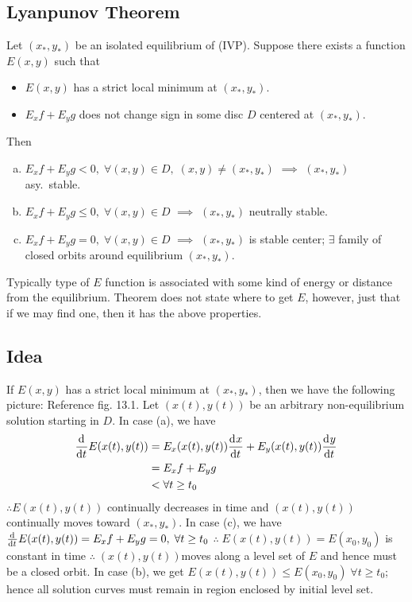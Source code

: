 \documentclass[12pt,twoside]{article}
\begin{document}
\subsection{Lyanpunov Theorem}
Let $(x_*,y_*)$ be an isolated equilibrium of (IVP). Suppose there exists a
function $E(x,y)$ such that
\begin{itemize}
\item $E(x,y)$ has a strict local minimum at $(x_*,y_*)$.
\item $E_x f + E_y g$ does not change sign in some disc $D$ centered at $(x_*,y_*)$.
\end{itemize}
Then
\begin{enumerate}[(a)]
\item $E_x f + E_y g<0,\;\forall(x,y)\in D,\;(x,y)\ne(x_*,y_*)$ $\implies$
  $(x_*,y_*)$ asy.\ stable.
\item $E_x f + E_y g\le0,\;\forall(x,y)\in D$ $\implies$ $(x_*,y_*)$ neutrally
  stable.
\item $E_x f + E_y g=0,\;\forall(x,y)\in D$ $\implies$ $(x_*,y_*)$ is stable center;
  $\exists$ family of closed orbits around equilibrium $(x_*,y_*)$.
\end{enumerate}
Typically type of $E$ function is associated with some kind of energy or
distance from the equilibrium. Theorem does not state where to get $E$, however,
just that if we may find one, then it has the above properties.
\subsection{Idea}
If $E(x,y)$ has a strict local minimum at $(x_*,y_*)$, then we have the
following picture: Reference fig. 13.1. Let $(x(t), y(t))$ be an arbitrary
non-equilibrium solution starting in $D$. In case (a), we have
\begin{equation}
  \begin{aligned}
    \frac{\mathrm{d}^{} {}}{\mathrm{d}{t}^{}}E(x(t),y(t))&=E_x(x(t),y(t))\frac{\mathrm{d}^{} {x}}{\mathrm{d}{t}^{}}+E_y(x(t),y(t))\frac{\mathrm{d}^{} {y}}{\mathrm{d}{t}^{}} \\
    &= E_x f + E_y g \\
    &<\forall t\ge t_0
  \end{aligned}
\end{equation}
$\therefore E(x(t),y(t))$ continually decreases in time and $(x(t),y(t))$
continually moves toward $(x_*,y_*)$. In case (c), we have
$\frac{\mathrm{d}^{} {}}{\mathrm{d}{t}^{}}E(x(t),y(t))=E_x f + E_y g=0,\;\forall t\ge t_0$
$\therefore\;E(x(t),y(t)) = E(x_0,y_0)$ is constant in time
$\therefore\;(x(t),y(t))$moves along a level set of $E$ and hence must be a
closed orbit.
In case (b), we get $E(x(t),y(t))\le E(x_0,y_0)\;\forall t\ge t_0$; hence all
solution curves must remain in region enclosed by initial level set.
\end{document}
